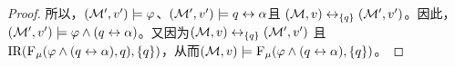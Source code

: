 \begin{proof}
	所以，$({\cal M}',v') \models \varphi$、$({\cal M}',v') \models q\leftrightarrow \alpha$且
	$({\cal M},v)\leftrightarrow_{\{q\}}({\cal M}',v')$。因此，$({\cal M}',v') \models \varphi \wedge (q\leftrightarrow\alpha)$。又因为$({\cal M},v)\leftrightarrow_{\{q\}}({\cal M}',v')$ 且$\textrm{IR}({\textsc{F}_{\textsc{$\mu$}}} (\varphi \wedge (q\leftrightarrow\alpha), q), \{q\})$，从而$({\cal M},v) \models {\textsc{F}_{\textsc{$\mu$}}} (\varphi \wedge (q\leftrightarrow\alpha), \{q\})$。
\end{proof}


